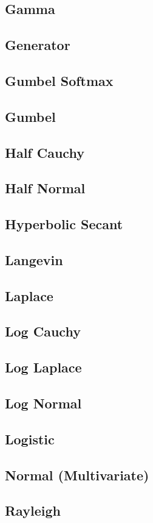 \documentclass{article}
\begin{document}
\subsection{Gamma}
\subsection{Generator}
\subsection{Gumbel Softmax}
\subsection{Gumbel}
\subsection{Half Cauchy}
\subsection{Half Normal}
\subsection{Hyperbolic Secant}
\subsection{Langevin}
\subsection{Laplace}
\subsection{Log Cauchy}
\subsection{Log Laplace}
\subsection{Log Normal}
\subsection{Logistic}
\subsection{Normal (Multivariate)}
\subsection{Rayleigh}
\end{document}
